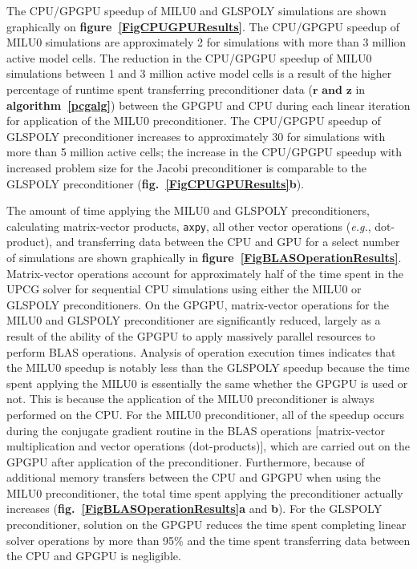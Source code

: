 \documentclass[12pt]{article}
\begin{document}
The CPU/GPGPU speedup of MILU0 and GLSPOLY simulations are shown graphically on \textbf{figure~\ref{FigCPUGPUResults}}. The CPU/GPGPU speedup of MILU0 simulations are approximately 2 for simulations with more than 3 million active model cells. The reduction in the CPU/GPGPU speedup of MILU0 simulations between 1 and 3 million active model cells is a result of the higher percentage of runtime spent transferring preconditioner data ($\mathbf{r \text{ and } z}$ in \textbf{algorithm~\ref{pcgalg}}) between the GPGPU and CPU during each linear iteration for application of the MILU0 preconditioner. The CPU/GPGPU speedup of  GLSPOLY preconditioner increases to approximately 30 for simulations with more than 5 million active cells; the increase in the CPU/GPGPU speedup with increased problem size for the Jacobi preconditioner is comparable to the GLSPOLY preconditioner (\textbf{fig.~\ref{FigCPUGPUResults}b}).

The amount of time applying the MILU0 and GLSPOLY preconditioners, calculating matrix-vector products, \texttt{axpy}, all other vector operations (\textit{e.g.}, dot-product), and transferring data between the CPU and GPU for a select number of simulations are shown graphically in \textbf{figure~\ref{FigBLASOperationResults}}. Matrix-vector operations account for approximately half of the time spent in the UPCG solver for sequential CPU simulations using either the MILU0 or GLSPOLY preconditioners. On the GPGPU, matrix-vector operations for the MILU0 and GLSPOLY preconditioner are significantly reduced, largely as a result of the ability of the GPGPU to apply massively parallel resources to perform BLAS operations.  Analysis of operation execution times indicates that the MILU0 speedup is notably less than the GLSPOLY speedup because the time spent applying the MILU0 is essentially the same whether the GPGPU is used or not.  This is because the application of the MILU0 preconditioner is always performed on the CPU.  For the MILU0 preconditioner, all of the speedup occurs during the conjugate gradient routine in the BLAS operations [matrix-vector multiplication and vector operations (dot-products)], which are carried out on the GPGPU after application of the preconditioner. Furthermore, because of additional memory transfers between the CPU and GPGPU when using the MILU0 preconditioner, the total time spent applying the preconditioner actually increases \color{cyan}(\textbf{fig.~\ref{FigBLASOperationResults}a} and \textbf{b})\color{black}. For the GLSPOLY preconditioner, solution on the GPGPU reduces the time spent completing linear solver operations by more than 95\% and the time spent transferring data between the CPU and GPGPU is negligible.
 
\end{document}
